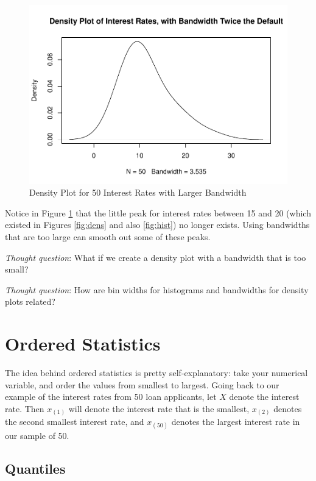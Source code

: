\documentclass[
]{book}
\begin{document}
\begin{figure}
\centering
\includegraphics{bookdown-demo_files/figure-latex/dens2-1.pdf}
\caption{\label{fig:dens2}Density Plot for 50 Interest Rates with Larger Bandwidth}
\end{figure}

Notice in Figure \ref{fig:dens2} that the little peak for interest rates between 15 and 20 (which existed in Figures \ref{fig:dens} and also \ref{fig:hist}) no longer exists. Using bandwidths that are too large can smooth out some of these peaks.

\emph{Thought question}: What if we create a density plot with a bandwidth that is too small?

\emph{Thought question}: How are bin widths for histograms and bandwidths for density plots related?

\section{Ordered Statistics}\label{ordered-statistics}

The idea behind ordered statistics is pretty self-explanatory: take your numerical variable, and order the values from smallest to largest. Going back to our example of the interest rates from 50 loan applicants, let \(X\) denote the interest rate. Then \(x_{(1)}\) will denote the interest rate that is the smallest, \(x_{(2)}\) denotes the second smallest interest rate, and \(x_{(50)}\) denotes the largest interest rate in our sample of 50.

\subsection{Quantiles}\label{quantiles}
\end{document}
